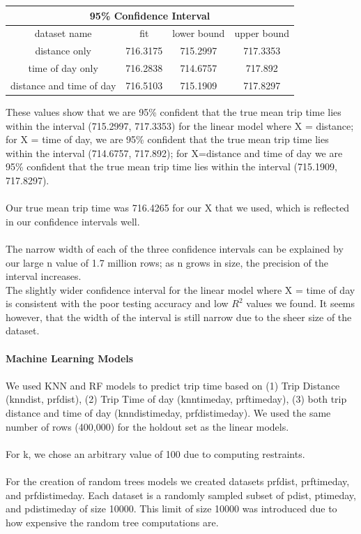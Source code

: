 \documentclass[letterpaper, 12 pt, conference]{article}
\begin{document}
\begin{center}
 \begin{tabular}{||c || c c c||} 
 \hline
  \multicolumn{4}{|c|}{95\% Confidence Interval} \\
  \hline
dataset name & fit & lower bound & upper bound\\ [0.5ex] 
 \hline\hline
 distance only & 716.3175 & 715.2997 & 717.3353\\ 
 \hline
 time of day only & 716.2838 & 714.6757 & 717.892\\
 \hline
 distance and time of day & 716.5103 & 715.1909 & 717.8297\\ [1ex] 
 \hline
\end{tabular}
\end{center}
These values show that we are 95\% confident that the true mean trip time lies within the interval (715.2997, 717.3353) for the linear model where X = distance; for X = time of day, we are 95\% confident that the true mean trip time lies within the interval (714.6757, 717.892); for X=distance and time of day we are  95\% confident that the true mean trip time lies within the interval (715.1909, 717.8297).
\\\\
Our true mean trip time was 716.4265 for our X that we used, which is reflected in our confidence intervals well.
\\\\
The narrow width of each of the three confidence intervals can be explained by our large n value of 1.7 million rows; as n grows in size, the precision of the interval increases.
\\
The slightly wider confidence interval for the linear model where X = time of day is consistent with the poor testing accuracy and low $R^2$ values we found. It seems however, that the width of the interval is still narrow due to the sheer size of the dataset. 
\\
\\\textbf{Machine Learning Models} 
\\
\\We used KNN and RF models to predict trip time based on (1) Trip Distance (knndist, prfdist), (2) Trip Time of day (knntimeday, prftimeday), (3) both trip distance and time of day (knndistimeday, prfdistimeday). We used the same number of rows (400,000) for the holdout set as the linear models. \\
\\For k, we chose an arbitrary value of 100 due to computing restraints. 
\\
\\For the creation of random trees models we created datasets prfdist, prftimeday, and prfdistimeday. Each dataset is a randomly sampled subset of pdist, ptimeday, and pdistimeday of size 10000. This limit of size 10000 was introduced due to how expensive the random tree computations are. 
\end{document}
